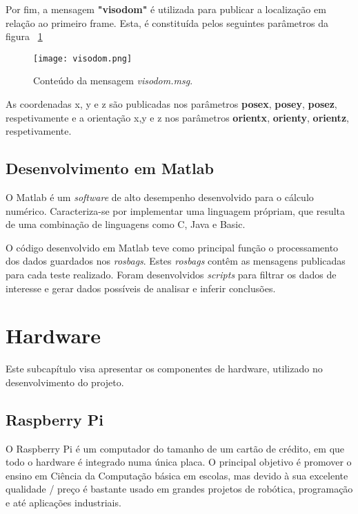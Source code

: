Por fim, a mensagem \textbf{"visodom"} é utilizada para publicar a localização em relação ao primeiro frame. Esta, é constituída pelos seguintes parâmetros da figura ~\ref{fig:visodom}

\begin{figure}[h!] %
	\begin{center}
		\leavevmode		
		\texttt{[image: visodom.png]}
		\caption{Conteúdo da mensagem \textit{visodom.msg}.}
		\label{fig:visodom}
	\end{center}
\end{figure}

As coordenadas x, y e z são publicadas nos parâmetros \textbf{posex}, \textbf{posey}, \textbf{posez}, respetivamente e a orientação x,y e z nos parâmetros \textbf{orientx}, \textbf{orienty}, \textbf{orientz}, respetivamente. 





\subsection{Desenvolvimento em Matlab}

O Matlab é um \textit{software} de alto desempenho desenvolvido para o cálculo numérico. Caracteriza-se por implementar uma linguagem própriam, que resulta de uma combinação de linguagens como C, Java e Basic.

O código desenvolvido em Matlab teve como principal função o processamento dos dados guardados nos \textit{rosbags}. Estes \textit{rosbags} contêm as mensagens publicadas para cada teste realizado. Foram desenvolvidos \textit{scripts} para filtrar os dados de interesse e gerar dados possíveis de analisar e inferir conclusões.


\section{Hardware}

Este subcapítulo visa apresentar os componentes de hardware, utilizado no desenvolvimento do projeto.

\subsection{Raspberry Pi}

O Raspberry Pi é um computador do tamanho de um cartão de crédito, em que todo o hardware é integrado numa única placa. O principal objetivo é promover o ensino em Ciência da Computação básica em escolas, mas devido à sua excelente qualidade / preço é bastante usado em grandes projetos de robótica, programação e até aplicações industriais. 

